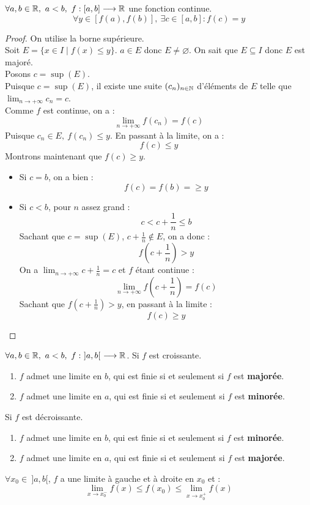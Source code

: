 \begin{theorem}
	$\forall a, b \in \mathbb{R},\ a < b,\ f : [a, b] \longrightarrow \mathbb{R}$ une fonction continue.
	\[ \forall y \in [f(a), f(b)],\ \exists c \in [a, b] : f(c) = y \]
\end{theorem}

\begin{proof}
	On utilise la borne supérieure.
	\\
	Soit $E = \{ x \in I \mid f(x) \leq y \}$. $a \in E$ donc $E \neq \varnothing$. On sait que $E \subseteq I$ donc $E$ est majoré.
	\\
	Posons $c = \sup(E)$.
	\\
	Puisque $c = \sup(E)$, il existe une suite $(c_n)_{n \in \mathbb{N}}$ d'éléments de $E$ telle que $\lim_{n \to +\infty} c_n = c$. 
	\\
	Comme $f$ est continue, on a :
	\[ \lim_{n \to +\infty} f(c_n) = f(c) \] 
	Puisque $c_n \in E,\ f(c_n) \leq y$. En passant à la limite, on a :
	\[ f(c) \leq y \]
	Montrons maintenant que $f(c) \geq y$.
	\begin{itemize}
		\item Si $c = b$, on a bien :
		\[ f(c) = f(b) = \geq y \]
		\item Si $c < b$, pour $n$ assez grand :
		\[ c < c + \frac{1}{n} \leq b \]
		Sachant que $c = \sup(E)$, $c + \frac{1}{n} \notin E$, on a donc :
		\[ f \left( c + \frac{1}{n} \right) > y \]
		On a $\lim_{n \to +\infty} c + \frac{1}{n} = c$ et $f$ étant continue :
		\[ \lim_{n \to +\infty} f \left( c + \frac{1}{n} \right) = f(c) \]
		Sachant que $f \left( c + \frac{1}{n} \right) > y$, en passant à la limite :
		\[ f(c) \geq y \]
	\end{itemize}
\end{proof}

\begin{theorem}
	$\forall a, b \in \mathbb{R},\ a < b,\ f :\ ]a, b[ \ \longrightarrow \mathbb{R}$. 
	Si $f$ est croissante.
	\begin{enumerate}
		\item $f$ admet une limite en $b$, qui est finie si et seulement si $f$ est \textbf{majorée}.
		\item $f$ admet une limite en $a$, qui est finie si et seulement si $f$ est \textbf{minorée}.
	\end{enumerate}
	Si $f$ est décroissante.
	\begin{enumerate}
		\item $f$ admet une limite en $b$, qui est finie si et seulement si $f$ est \textbf{minorée}.
		\item $f$ admet une limite en $a$, qui est finie si et seulement si $f$ est \textbf{majorée}.
	\end{enumerate}
	$\forall x_0 \in \ ]a, b[$, $f$ a une limite à gauche et à droite en $x_0$ et :
	\[ \lim_{x \to x_0^-} f(x) \leq f(x_0) \leq \lim_{x \to x_0^+} f(x) \]
\end{theorem}

